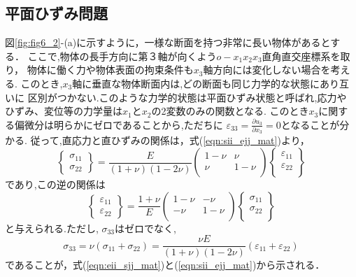 \documentclass[10pt,a4j]{jarticle}
\begin{document}
\subsection{平面ひずみ問題}
図\ref{fig:fig6_2}-(a)に示すように，一様な断面を持つ非常に長い物体があるとする．
ここで,物体の長手方向に第３軸が向くよう$o-x_1x_2x_3$直角直交座標系を取り，
物体に働く力や物体表面の拘束条件も$x_3$軸方向には変化しない場合を考える.
このとき,$x_3$軸に垂直な物体断面内は,どの断面も同じ力学的な状態にあり互いに
区別がつかない.このような力学的状態は平面ひずみ状態と呼ばれ,応力や
ひずみ、変位等の力学量は$x_1$と$x_2$の2変数のみの関数となる.
このとき$x_3$に関する偏微分は明らかにゼロであることから,ただちに
$\varepsilon_{33}=\frac{\partial u_3}{\partial x_3}=0$となることが分かる.
従って,直応力と直ひずみの関係は，式(\ref{eqn:sii_ejj_mat})より，
\begin{equation}
	\left\{ 
	\begin{array}{*{20}{c}}
		\sigma _{11}\\
		\sigma _{22}
	\end{array} 
	\right\} 
	= 
	\frac{E}{\left( 1 + \nu  \right)\left( 1 - 2\nu  \right)}
	\left( 
		\begin{array}{*{20}{c}}
		1 - \nu & \nu \\
		\nu & 1 - \nu \\
		\end{array}
	\right)
	\left\{ 
		\begin{array}{*{20}{c}}
		\varepsilon _{11}\\
		\varepsilon _{22}\\
		\end{array}
	\right\}
	\label{eqn:Hooke_pstrain}
\end{equation}
であり,この逆の関係は
\begin{equation}
	\left\{ 
	\begin{array}{*{20}{c}}
		\varepsilon _{11}\\
		\varepsilon_{22}
	\end{array} 
	\right\} 
	= 
	\frac{1+\nu}{E}
	\left( 
		\begin{array}{*{20}{c}}
		1 - \nu & -\nu \\
		-\nu & 1 - \nu \\
		\end{array}
	\right)
	\left\{ 
		\begin{array}{*{20}{c}}
		\sigma_{11}\\
		\sigma_{22}\\
		\end{array}
	\right\}
	\label{eqn:Hooke_pstrain}
\end{equation}
と与えられる.ただし, $\sigma_{33}$はゼロでなく,
\begin{equation}
	\sigma_{33}
	=\nu \left(\sigma_{11}+\sigma_{22}\right)
	=\frac{\nu E}{(1+\nu)(1-2\nu)}\left(\varepsilon_{11}+\varepsilon_{22}\right)
	\label{eqn:s33_pstrain}
\end{equation}
であることが，式(\ref{eqn:eii_sjj_mat})と(\ref{eqn:sii_ejj_mat})から示される．
\end{document}
